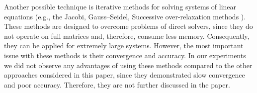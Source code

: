 Another possible technique is iterative methods for solving systems of linear equations (e.g., the Jacobi, Gauss--Seidel, Successive over-relaxation methods \cite{press2007}). These methods are designed to overcome problems of direct solvers, since they do not operate on full matrices and, therefore, consume less memory. Consequently, they can be applied for extremely large systems. However, the most important issue with these methods is their convergence and accuracy. In our experiments we did not observe any advantages of using these methods compared to the other approaches considered in this paper, since they demonstrated slow convergence and poor accuracy. Therefore, they are not further discussed in the paper.
